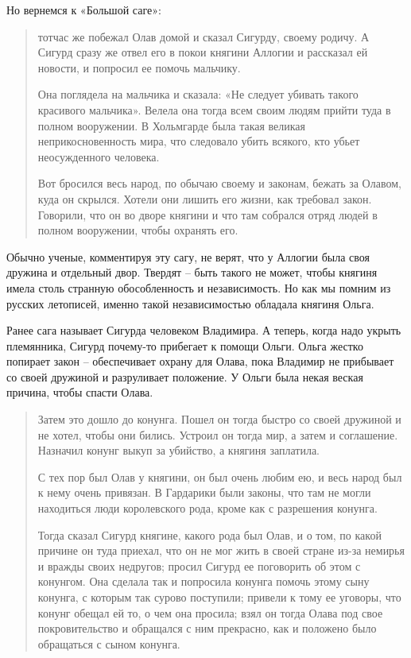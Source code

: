 Но вернемся к «Большой саге»:

\begin{quotation}
тотчас же побежал Олав домой и сказал Сигурду, своему родичу. А Сигурд сразу же отвел его в покои княгини Аллогии и рассказал ей новости, и попросил ее помочь мальчику. 

Она поглядела на мальчика и сказала: «Не следует убивать такого красивого мальчика». Велела она тогда всем своим людям прийти туда в полном вооружении. В Хольмгарде была такая великая неприкосновенность мира, что следовало убить всякого, кто убьет неосужденного человека. 

Вот бросился весь народ, по обычаю своему и законам, бежать за Олавом, куда он скрылся. Хотели они лишить его жизни, как требовал закон. Говорили, что он во дворе княгини и что там собрался отряд людей в полном вооружении, чтобы охранять его.
\end{quotation}

Обычно ученые, комментируя эту сагу, не верят, что у Аллогии была своя дружина и отдельный двор. Твердят – быть такого не может, чтобы княгиня имела столь странную обособленность и независимость. Но как мы помним из русских летописей, именно такой независимостью обладала княгиня Ольга. 

Ранее сага называет Сигурда человеком Владимира. А теперь, когда надо укрыть племянника, Сигурд почему-то прибегает к помощи Ольги. Ольга жестко попирает закон – обеспечивает охрану для Олава, пока Владимир не прибывает со своей дружиной и разруливает положение. У Ольги была некая веская причина, чтобы спасти Олава.

\begin{quotation}
Затем это дошло до конунга. Пошел он тогда быстро со своей дружиной и не хотел, чтобы они бились. Устроил он тогда мир, а затем и соглашение. Назначил конунг выкуп за убийство, а княгиня заплатила.

С тех пор был Олав у княгини, он был очень любим ею, и весь народ был к нему очень привязан. В Гардарики были законы, что там не могли находиться люди королевского рода, кроме как с разрешения конунга.

Тогда сказал Сигурд княгине, какого рода был Олав, и о том, по какой причине он туда приехал, что он не мог жить в своей стране из-за немирья и вражды своих недругов; просил Сигурд ее поговорить об этом с конунгом. Она сделала так и попросила конунга помочь этому сыну конунга, с которым так сурово поступили; привели к тому ее уговоры, что конунг обещал ей то, о чем она просила; взял он тогда Олава под свое покровительство и обращался с ним прекрасно, как и положено было обращаться с сыном конунга.
\end{quotation}

